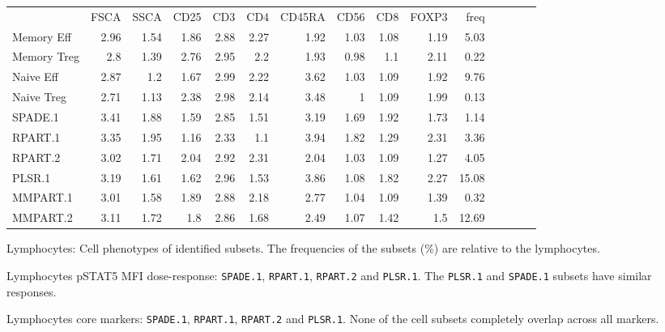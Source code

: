 \begin{table}[h]\footnotesize
\centering
\begin{tabular}{lrrrrrrrrrrrrrr}
\rowcolor{Gray}
            & FSCA & SSCA & CD25 & CD3  & CD4  & CD45RA & CD56 & CD8  & FOXP3 & freq \\
Memory Eff  & 2.96 & 1.54 & 1.86 & 2.88 & 2.27 & 1.92 & 1.03 & 1.08 & 1.19 & 5.03 \\
Memory Treg & 2.8  & 1.39 & 2.76 & 2.95 & 2.2  & 1.93 & 0.98 & 1.1  & 2.11 & 0.22 \\
Naive Eff   & 2.87 & 1.2  & 1.67 & 2.99 & 2.22 & 3.62 & 1.03 & 1.09 & 1.92 & 9.76 \\
Naive Treg  & 2.71 & 1.13 & 2.38 & 2.98 & 2.14 & 3.48 & 1    & 1.09 & 1.99 & 0.13 \\
\hline
SPADE.1     & 3.41 & 1.88 & 1.59 & 2.85 & 1.51 & 3.19 & 1.69 & 1.92 & 1.73 & 1.14 \\
RPART.1     & 3.35 & 1.95 & 1.16 & 2.33 & 1.1  & 3.94 & 1.82 & 1.29 & 2.31 & 3.36 \\
RPART.2     & 3.02 & 1.71 & 2.04 & 2.92 & 2.31 & 2.04 & 1.03 & 1.09 & 1.27 & 4.05 \\
PLSR.1      & 3.19 & 1.61 & 1.62 & 2.96 & 1.53 & 3.86 & 1.08 & 1.82 & 2.27 & 15.08 \\
MMPART.1    & 3.01 & 1.58 & 1.89 & 2.88 & 2.18 & 2.77 & 1.04 & 1.09 & 1.39 & 0.32 \\
MMPART.2    & 3.11 & 1.72 & 1.8  & 2.86 & 1.68 & 2.49 & 1.07 & 1.42 & 1.5  & 12.69 \\
\end{tabular}
{ Lymphocytes: Cell phenotypes of identified subsets. }
{ The frequencies of the subsets (\%) are relative to the lymphocytes. }
\end{table}

{ Lymphocytes pSTAT5 MFI dose-response: \texttt{SPADE.1}, \texttt{RPART.1}, \texttt{RPART.2} and \texttt{PLSR.1}. }
{
    The \texttt{PLSR.1} and \texttt{SPADE.1} subsets have similar responses.
}


{ Lymphocytes core markers: \texttt{SPADE.1}, \texttt{RPART.1}, \texttt{RPART.2} and \texttt{PLSR.1}. }
{ 
    None of the cell subsets completely overlap across all markers.
}



